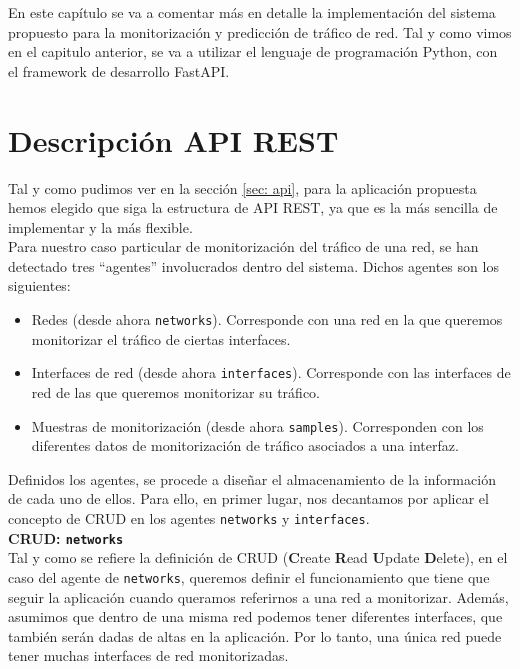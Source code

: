 \documentclass[a4paper, oneside, 12pt]{book}
\begin{document}
	\noindent En este capítulo se va a comentar más en detalle la implementación del sistema propuesto para la monitorización y predicción de tráfico de red. Tal y como vimos en el capitulo anterior, se va a utilizar el lenguaje de programación Python, con el framework de desarrollo FastAPI.
	
	\section{Descripción API REST}
	
	\noindent Tal y como pudimos ver en la sección \ref{sec: api}, para la aplicación propuesta hemos elegido que siga la estructura de API REST, ya que es la más sencilla de implementar y la más flexible. \\
	
	\noindent Para nuestro caso particular de monitorización del tráfico de una red, se han detectado tres ``agentes'' involucrados dentro del sistema. Dichos agentes son los siguientes:
	
	\begin{itemize}
		\item Redes (desde ahora \texttt{networks}). Corresponde con una red en la que queremos monitorizar el tráfico de ciertas interfaces.
		\item Interfaces de red (desde ahora \texttt{interfaces}). Corresponde con las interfaces de red de las que queremos monitorizar su tráfico.
		\item Muestras de monitorización (desde ahora \texttt{samples}). Corresponden con los diferentes datos de monitorización de tráfico asociados a una interfaz.
	\end{itemize}

	\noindent Definidos los agentes, se procede a diseñar el almacenamiento de la información de cada uno de ellos. Para ello, en primer lugar, nos decantamos por aplicar el concepto de CRUD en los agentes \texttt{networks} y \texttt{interfaces}. \\
	
	\noindent \textbf{\large CRUD: \texttt{networks}} \\
	
	\noindent Tal y como se refiere la definición de CRUD (\textbf{C}reate \textbf{R}ead \textbf{U}pdate \textbf{D}elete), en el caso del agente de \texttt{networks}, queremos definir el funcionamiento que tiene que seguir la aplicación cuando queramos referirnos a una red a monitorizar. Además, asumimos que dentro de una misma red podemos tener diferentes interfaces, que también serán dadas de altas en la aplicación. Por lo tanto, una única red puede tener muchas interfaces de red monitorizadas. \\
	
\end{document}
